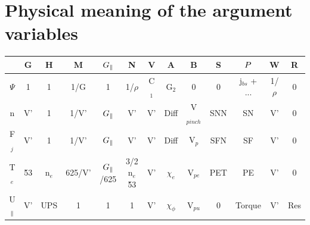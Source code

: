 \section{Physical meaning of the argument variables}
\label{sec.vars}
%
\begin{table}[!ht]
\begin{tabular}{|c|c|c|c|c|c|c|c|c|c|c|c|c|}
\hline
\hline
       & G   & H    & M       & $G_{\parallel}$    & N              & V     & A          & B         & S   & $P$        & W        & R   \\
\hline
\hline
$\Psi$ & 1   & 1    & 1/G     & 1         & 1/$\rho$       & C$_1$ & G$_2$      & 0          & 0   & j$_{bs}$ + ...& 1/$\rho$ & 0   \\
\hline
n      & V'  & 1    & 1/V'    & $G_{\parallel}$    & V'             & V'    & Diff       & V$_{pinch}$ & SNN & SN           & V'       & 0   \\
\hline
F$_j$  & V'  & 1    & 1/V'    & $G_{\parallel}$    & V'             & V'    & Diff       & V$_{p}$    & SFN & SF            & V'      & 0   \\
\hline
T$_e$  & \v53 & n$_e$ & 625/V' & $G_{\parallel}$/625 & 3/2 n$_e$ \v53 & V'   & $\chi_e$    & V$_{pe}$   & PET & PE            & V'      & 0   \\
\hline
U$_\parallel$ & V' & UPS   & 1      & 1          & 1              & V'    & $\chi_\phi$ & V$_{pu}$   & 0   & Torque        & V'      & Res \\
\hline
\end{tabular}
\end{table}
%


